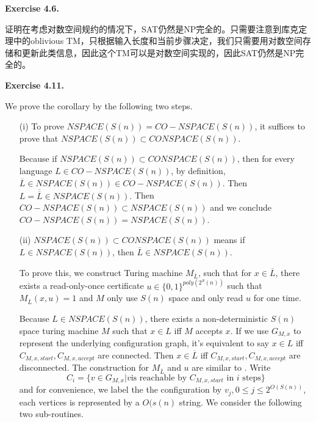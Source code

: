 \documentclass[a4paper]{article}
\newenvironment{exercise}[1]{
	\par
	\noindent\textbf{Exercise #1.}\quad
}{
	\par
	\bigskip
}
\begin{document}
\begin{exercise}{4.6}
    证明在考虑对数空间规约的情况下，SAT仍然是NP完全的。只需要注意到库克定理中的oblivious TM，只根据输入长度和当前步骤决定，我们只需要用对数空间存储和更新此类信息，因此这个TM可以是对数空间实现的，因此SAT仍然是NP完全的。
\end{exercise}

\begin{exercise}{4.11}
We prove the corollary by the following two steps.
\begin{itemize}
\item[(i)] To prove $NSPACE(S(n))=CO-NSPACE(S(n))$, it suffices to prove that $NSPACE(S(n))\subset CONSPACE(S(n))$.

 Because  if $NSPACE(S(n))\subset CONSPACE(S(n))$, then for every language $L\in CO-NSPACE(S(n))$, by definition, $\overline{L}\in NSPACE(S(n))\in CO-NSPACE(S(n))$.  Then $L=\overline{\overline{L}}\in NSPACE(S(n)).$ Then $CO-NSPACE(S(n))\subset NSPACE(S(n))$ and we conclude $CO-NSPACE(S(n))=NSPACE(S(n))$.

\item[(ii)]
$NSPACE(S(n))\subset CONSPACE(S(n))$ means if $L\in NSPACE(S(n))$, then $\overline{L}\in NSPACE(S(n))$. 

To prove this, we construct Turing machine $M_{\overline{L}}$, such that for $x\in \overline{L}$, there exists a read-only-once certificate $u\in \{0,1\}^{poly(2^S(n))}$ such that $M_{\overline{L}}(x,u)=1$ and $M$ only use $S(n)$ space and only read $u$ for one time.

Because $L\in NSPACE(S(n))$, there exists a non-deterministic $S(n)$ space turing machine $M$ such that $x\in L$ iff $M$ accepts $x$. If we use $G_{M,x}$ to represent the underlying configuration graph, it's equivalent to say $x\in L$ iff $C_{M,x,start}, C_{M,x,accept}$ are connected. Then $x\in\overline{L}$ iff $C_{M,x,start}, C_{M,x,accept}$ are disconnected. The construction for $M_{\overline{L}}$ and $u$ are similar to . Write
$$
C_i=\{ v\in G_{M,x}| v \text{is reachable by $C_{M,x,start}$ in $i$ steps} \}
$$ and for convenience, we label the the configuration by $v_j, 0\leq j\leq 2^{O(S(n))}$, each vertices is represented by a $O(s(n)$ string. We consider the following two sub-routines.


\end{itemize}
\end{exercise}
\end{document}
